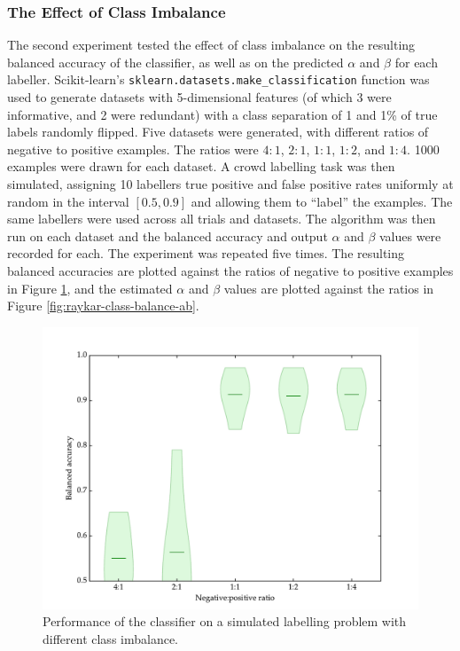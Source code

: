         \subsubsection{The Effect of Class Imbalance}

            The second experiment tested the effect of class imbalance on the
            resulting balanced accuracy of the classifier, as well as on the
            predicted $\alpha$ and $\beta$ for each labeller. Scikit-learn's \citep
            {scikit-learn} \texttt{sklearn.datasets.make\_classification} function
            was used to generate datasets with 5-dimensional features (of which 3
            were informative, and 2 were redundant) with a class separation of 1 and
            1\% of true labels randomly flipped. Five datasets were generated, with
            different ratios of negative to positive examples. The ratios were
            $4:1$, $2:1$, $1:1$, $1:2$, and $1:4$. 1000 examples were drawn for each
            dataset. A crowd labelling task was then simulated, assigning 10
            labellers true positive and false positive rates uniformly at random in
            the interval $[0.5, 0.9]$ and allowing them to ``label'' the examples.
            The same labellers were used across all trials and datasets. The
            \citeauthor{raykar10} algorithm was then run on each dataset and the
            balanced accuracy and output $\alpha$ and $\beta$ values were recorded
            for each. The experiment was repeated five times. The resulting balanced
            accuracies are plotted against the ratios of negative to positive
            examples in Figure \ref{fig:raykar-class-balance-ba}, and the estimated
            $\alpha$ and $\beta$ values are plotted against the ratios in Figure
            \ref{fig:raykar-class-balance-ab}.

            \begin{figure}[!ht]
                \centering
                \includegraphics[width=\textwidth]
                    {images/experiments/raykar_class_balance_ba}
                \caption{Performance of the \citeauthor{raykar10} classifier on a
                    simulated labelling problem with different class imbalance.}
                \label{fig:raykar-class-balance-ba}
            \end{figure}

